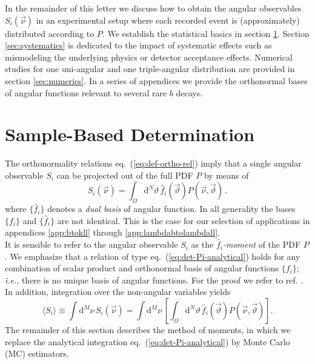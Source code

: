 \documentclass[aps,prd,reprint,nofootinbib,preprintnumbers]{revtex4}
\newcommand{\rmdx}[1]{\mbox{d} #1 \,} %
\newcommand{\refeq}[1]{eq.~(\ref{eq:#1})}
\newcommand{\ie}{\textit{i.e.}}
\newcommand{\nuvec}{\vec{\nu}}
\newcommand{\thvec}{\vec{\vartheta}}
\renewcommand{\theta}{\vartheta}
\begin{document}
In the remainder of this letter we discuss how to obtain the angular
observables $S_i(\nuvec)$ in an experimental setup where each recorded
event is (approximately) distributed according to $P$.  We establish
the statistical basics in section \ref{sec:sample-based-det}. Section
\ref{sec:systematics} is dedicated to the impact of systematic effects
such as mismodeling the underlying physics or detector acceptance
effects. Numerical studies for one uni-angular and one triple-angular
distribution are provided in section \ref{sec:numerics}. In a series
of appendices we provide the orthonormal bases of angular functions
relevant to several rare $b$ decays.



\section{Sample-Based Determination}
\label{sec:sample-based-det}

The orthonormality relations \refeq{def-ortho-rel} imply that a single angular observable $S_i$
can be projected out of the full PDF $P$ by means of
\begin{equation}
    \label{eq:det-Pi-analytical}
    S_i(\nuvec) = \int_{\Omega} \rmdx{^N \theta} \hat{f}_i(\thvec) P(\nuvec, \thvec)\,.
\end{equation}
where $\lbrace \hat{f}_i \rbrace$ denotes a \emph{dual basis} of angular function. In all generality
the bases $\lbrace f_i \rbrace$ and $\lbrace \hat{f}_i \rbrace$ are not identical. This is the
case for our selection of applications in appendices \ref{app:btokll} through \ref{app:lambdabtolambdall}.\\

It is sensible to refer to the angular observable $S_i$ as the \emph{$\hat{f}_i$-moment} of the PDF $P$.
We emphasize that a relation of type \refeq{det-Pi-analytical} holds for any combination of
scalar product and orthonormal basis of angular functions $\lbrace f_i \rbrace$; \ie, there is no unique
basis of angular functions. For the proof we refer to ref. \cite{Dighe:1998vk}.\\
In addition, integration over the non-angular variables yields
\begin{equation}
    \langle S_i\rangle
    \equiv \int \rmdx{^M \nu} S_i(\nuvec)
    = \int \rmdx{^M \nu} \left[\int_{\Omega} \rmdx{^N \theta}\hat{f}_i(\thvec) P(\nuvec,\thvec) \right].
\end{equation}
The remainder of this section describes the method of moments, in which we replace the
analytical integration \refeq{det-Pi-analytical} by Monte Carlo (MC) estimators.\\
\end{document}
